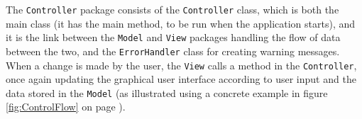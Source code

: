 The \texttt{Controller} package consists of the \texttt{Controller} class, which is both the main class (it has the main method, to be run when the application starts), and it is the link between the \texttt{Model} and \texttt{View} packages handling the flow of data between the two, and the \texttt{ErrorHandler} class for creating warning messages. When a change is made by the user, the \texttt{View} calls a method in the \texttt{Controller}, once again updating the graphical user interface according to user input and the data stored in the \texttt{Model} (as illustrated using a concrete example in figure \ref{fig:ControlFlow} on page \pageref{fig:ControlFlow}).